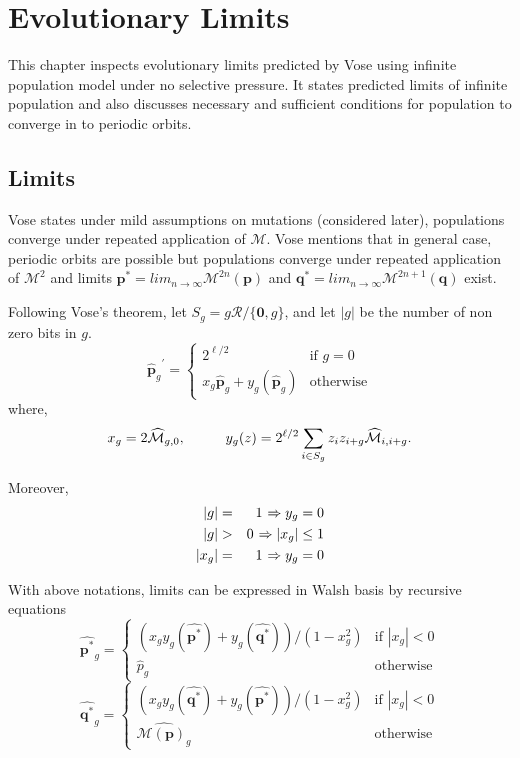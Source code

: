 \chapter{Evolutionary Limits} \label{ch:evolutionary limits}
This chapter inspects evolutionary limits predicted by Vose using infinite population model under no selective pressure. 
It states predicted limits of infinite population and also discusses necessary and sufficient conditions for population to converge in to periodic orbits. 

\section{Limits}
\label{Limits}
Vose states under mild assumptions on mutations (considered later), populations converge under repeated application 
of $\mathcal{M}$. Vose mentions that in general case, periodic orbits are possible but populations converge under 
repeated application of $\mathcal{M}^2$ and limits ${\bm p}^\ast = lim_{n \rightarrow \infty} \mathcal{M}^{2n}({\bm p})$ 
and ${\bm q}^\ast = lim_{n \rightarrow \infty} \mathcal{M}^{2n+1}({\bm q})$ exist.

Following Vose's theorem, let $S_g = g \mathcal{R} / \{\textbf{0}, g\}$, and let $|g|$ be the number of non zero bits in $g$.
\[
{{\widehat{{\bm p}}}_g}^{\prime}  = \begin{cases}
    2^{\ell /2}  & \text{if $g = 0$}\\
    x_g \widehat{{\bm p}}_g + y_g(\widehat{{\bm p}}_g) & \text{otherwise}
  \end{cases}
\]
where,
\[
x_g = 2\widehat{\mathcal{M}}_{g,0},  \hspace*{1cm} y_g(z) = 2^{\ell /2} \sum_{i \in S_g} z_i z_{i+g} \widehat{\mathcal{M}}_{i,i+g}.
\]

Moreover, 
\begin{eqnarray*}
|g| & = & 1 \hspace{0.01in} \Rightarrow y_g = 0 \\
|g| & > & 0 \hspace{0.01in} \Rightarrow |x_g| \leq 1 \\
|x_g| & = & 1 \hspace{0.01in} \Rightarrow y_g = 0
\end{eqnarray*}

With above notations, limits can be expressed in Walsh basis by recursive equations 
\begin{equation}
\label{lt1}
\widehat{{\bm p}^{\ast}}_g  = \begin{cases}
    (x_g y_g(\widehat{{\bm p}^{\ast}}) + y_g(\widehat{{\bm q}^{\ast}}))/(1-x_g^2)  & \text{if $|x_g| < 0$}\\
    \widehat{p}_g  & \text{otherwise}
  \end{cases}
\end{equation}
\begin{equation}
\label{lt2}
\widehat{{\bm q}^{\ast}}_g  = \begin{cases}
    (x_g y_g(\widehat{{\bm q}^{\ast}}) + y_g(\widehat{{\bm p}^{\ast}}))/(1-x_g^2)  & \text{if $|x_g| < 0$}\\
    \widehat{\mathcal{M}({\bm p})_g}  & \text{otherwise}
  \end{cases}
\end{equation}

